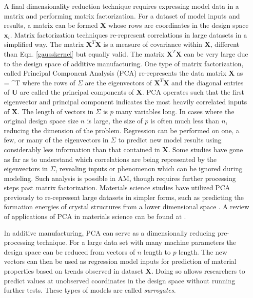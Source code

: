 A final dimensionality reduction technique requires expressing model data in a matrix and performing matrix factorization. For a dataset of model inputs and results, a matrix can be formed $\mathbf{X}$ whose rows are coordinates in the design space $\mathbf{x}_i$. Matrix factorization techniques re-represent correlations in large datasets in a simplified way. The matrix $\mathbf{X}^T\mathbf{X}$ is a measure of covariance within $\mathbf{X}$, different than Eqn. \ref{gausskernel} but equally valid. The matrix $\mathbf{X}^T\mathbf{X}$ can be very large due to the design space of additive manufacturing. One type of matrix factorization, called Principal Component Analysis (PCA) re-represents the data matrix $\mathbf{X}$ as
\eqn
	 =  \mathbf{\Sigma}^T
	\label{PCA}
\equ
where the rows of $\Sigma$ are the eigenvectors of $\mathbf{X}^T\mathbf{X}$ and the diagonal entries of $\mathbf{U}$ are called the principal components of $\mathbf{X}$. PCA operates such that the first eigenvector and principal component indicates the most heavily correlated inputs of $\mathbf{X}$. The length of vectors in $\Sigma$ is $p$ many variables long. In cases where the original design space size $n$ is large, the size of $p$ is often much less than $n$, reducing the dimension of the problem. Regression can be performed on one, a few, or many of the eigenvectors in $\Sigma$ to predict new model results using considerably less information than that contained in $\mathbf{X}$. Some studies have gone as far as to understand which correlations are being represented by the eigenvectors in $\Sigma$, revealing inputs or phenomenon which can be ignored during modeling. Such analysis is possible in AM, though requires further processing steps past matrix factorization. Materials science studies have utilized PCA previously to re-represent large datasets in simpler forms, such as predicting the formation energies of crystal structures from a lower dimensional space \cite{Curtarolo2003}. A review of applications of PCA in materials science can be found at \cite{Rajan2009}.

In additive manufacturing, PCA can serve as a dimensionally reducing pre-processing technique. For a large data set with many machine parameters the design space can be reduced from vectors of $n$ length to $p$ length. The new vectors can then be used as regression model inputs for prediction of material properties based on trends observed in dataset $\mathbf{X}$. Doing so allows researchers to predict values at unobserved coordinates in the design space without running further tests. These types of models are called \textit{surrogates}.
